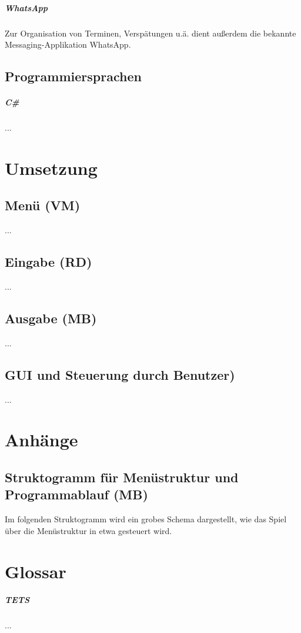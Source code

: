 \documentclass[11pt]{scrreprt}
\begin{document}
\paragraph{WhatsApp}
Zur Organisation von Terminen, Versp\"atungen u.ä. dient außerdem die bekannte Messaging-Applikation WhatsApp.


\section{Programmiersprachen}
\paragraph{C\#}
...

\newpage
\chapter{Umsetzung}
\section{Menü (VM)}
...
\section{Eingabe (RD)}
...
\section{Ausgabe (MB)}
...
\section{GUI und Steuerung durch Benutzer)}
...
\newpage
\chapter{Anhänge}
\section{Struktogramm für Menüstruktur und Programmablauf (MB)}
Im folgenden Struktogramm wird ein grobes Schema dargestellt, wie das Spiel über die Menüstruktur in etwa gesteuert wird.

\newpage
\chapter{Glossar}
\paragraph{TETS} ...
\end{document}
